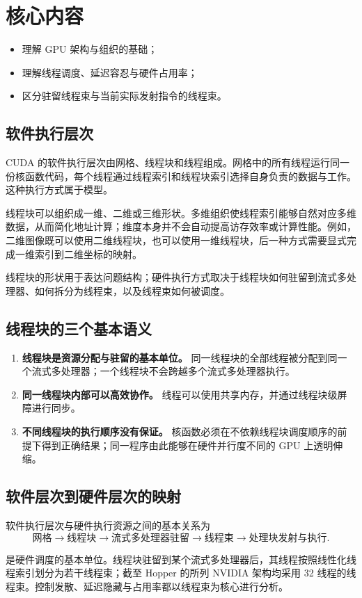 \section{核心内容}

\begin{overviewbox}
\begin{itemize}
  \item 理解 GPU 架构与组织的基础；
  \item 理解线程调度、延迟容忍与硬件占用率；
  \item 区分驻留线程束与当前实际发射指令的线程束。
\end{itemize}
\end{overviewbox}

\subsection{软件执行层次}

CUDA 的软件执行层次由网格、线程块和线程组成。网格中的所有线程运行同一份核函数代码，每个线程通过线程索引和线程块索引选择自身负责的数据与工作。这种执行方式属于模型。

线程块可以组织成一维、二维或三维形状。多维组织使线程索引能够自然对应多维数据，从而简化地址计算；维度本身并不会自动提高访存效率或计算性能。例如，二维图像既可以使用二维线程块，也可以使用一维线程块，后一种方式需要显式完成一维索引到二维坐标的映射。

\begin{keybox}
线程块的形状用于表达问题结构；硬件执行方式取决于线程块如何驻留到流式多处理器、如何拆分为线程束，以及线程束如何被调度。
\end{keybox}

\subsection{线程块的三个基本语义}

\begin{enumerate}
  \item \textbf{线程块是资源分配与驻留的基本单位。} 同一线程块的全部线程被分配到同一个流式多处理器；一个线程块不会跨越多个流式多处理器执行。
  \item \textbf{同一线程块内部可以高效协作。} 线程可以使用共享内存，并通过线程块级屏障进行同步。
  \item \textbf{不同线程块的执行顺序没有保证。} 核函数必须在不依赖线程块调度顺序的前提下得到正确结果；同一程序由此能够在硬件并行度不同的 GPU 上透明伸缩。
\end{enumerate}

\subsection{软件层次到硬件层次的映射}

软件执行层次与硬件执行资源之间的基本关系为
\[
\boxed{
\text{网格} \rightarrow \text{线程块} \rightarrow \text{流式多处理器驻留}
\rightarrow \text{线程束} \rightarrow \text{处理块发射与执行}
}.
\]

是硬件调度的基本单位。线程块驻留到某个流式多处理器后，其线程按照线性化线程索引划分为若干线程束；截至 Hopper 的所列 NVIDIA 架构均采用 32 线程的线程束。控制发散、延迟隐藏与占用率都以线程束为核心进行分析。
